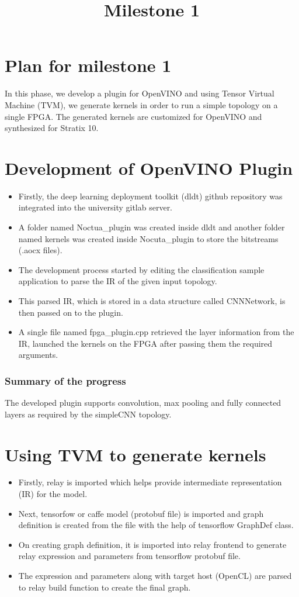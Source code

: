 \documentclass[titlepage]{report}
\title{\textbf{Milestone 1}}
\begin{document}
\maketitle

\tableofcontents{}
\newpage

\chapter{Plan for milestone 1}
In this phase, we develop a plugin for OpenVINO and using Tensor Virtual Machine (TVM), we generate kernels in order to run a simple topology on a single FPGA. The generated kernels are customized for OpenVINO and synthesized for Stratix 10.
\chapter{Development of OpenVINO Plugin}
\begin{itemize}
\item Firstly, the deep learning deployment toolkit (dldt) github repository was integrated into the university gitlab server. 
\item A folder named Noctua\_plugin was created inside dldt and another folder named kernels was created inside Nocuta\_plugin to store the bitstreams (.aocx files).
\item The development process started by editing the classification sample application to parse the IR of the given input topology. 
\item This parsed IR, which is stored in a data structure called CNNNetwork, is then passed on to the plugin. 
\item A single file named fpga\_plugin.cpp retrieved the layer information from the IR, launched the kernels on the FPGA after passing them the required arguments.
\end{itemize} 
\subsection{Summary of the progress}
The developed plugin supports convolution, max pooling and fully connected layers as required by the simpleCNN topology.



\chapter{Using TVM to generate kernels}
\begin{itemize}
    \item Firstly, relay is imported which helps provide intermediate representation (IR) for the model.
    \item Next, tensorfow or caffe model (protobuf file) is imported and graph definition is created from the file with the help of tensorflow GraphDef class.
    \item On creating graph definition, it is imported into relay frontend to generate relay expression and parameters from tensorflow protobuf file. 
    \item The expression and parameters along with target host (OpenCL) are parsed to relay build function to create the final graph. 
\end{itemize}
\end{document}
